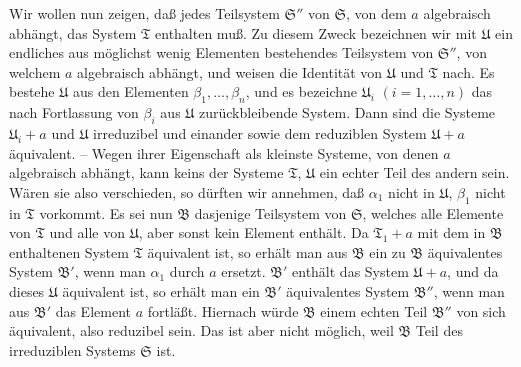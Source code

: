 Wir wollen nun zeigen, daß jedes Teilsystem $\mathfrak S''$ von $\mathfrak S$, von dem $a$ algebraisch abhängt, das System $\mathfrak T$ enthalten muß. Zu diesem Zweck bezeichnen wir mit $\mathfrak U$ ein endliches aus möglichst wenig Elementen bestehendes Teilsystem von $\mathfrak S''$, von welchem $a$ algebraisch abhängt, und weisen die Identität von $\mathfrak U$ und $\mathfrak T$ nach. Es bestehe $\mathfrak U$ aus den Elementen $\beta_1,\ldots,\beta_n$, und es bezeichne $\mathfrak U_i$ $(i=1,\ldots,n)$ das nach Fortlassung von $\beta_i$ aus $\mathfrak U$ zurückbleibende System. Dann sind die Systeme $\mathfrak U_i+a$ und $\mathfrak U$ irreduzibel und einander sowie dem reduziblen System $\mathfrak U+a$ äquivalent. -- Wegen ihrer Eigenschaft als kleinste Systeme, von denen $a$ algebraisch abhängt, kann keins der Systeme $\mathfrak T$, $\mathfrak U$ ein echter Teil des andern sein. Wären sie also verschieden, so dürften wir annehmen, daß $\alpha_1$ nicht in $\mathfrak U$, $\beta_1$ nicht in $\mathfrak T$ vorkommt. Es sei nun $\mathfrak B$ dasjenige Teilsystem von $\mathfrak S$, welches alle Elemente von $\mathfrak T$ und alle von $\mathfrak U$, aber sonst kein Element enthält. Da $\mathfrak T_1+a$ mit dem in $\mathfrak B$ enthaltenen System $\mathfrak T$ äquivalent ist, so erhält man aus $\mathfrak B$ ein zu $\mathfrak B$ äquivalentes System $\mathfrak B'$, wenn man $\alpha_1$ durch $a$ ersetzt. $\mathfrak B'$ enthält das System $\mathfrak U+a$, und da dieses $\mathfrak U$ äquivalent ist, so erhält man ein $\mathfrak B'$ äquivalentes System $\mathfrak B''$, wenn man aus $\mathfrak B'$ das Element $a$ fortläßt. Hiernach würde $\mathfrak B$ einem echten Teil $\mathfrak B''$ von sich äquivalent, also reduzibel sein. Das ist aber nicht möglich, weil $\mathfrak B$ Teil des irreduziblen Systems $\mathfrak S$ ist.

